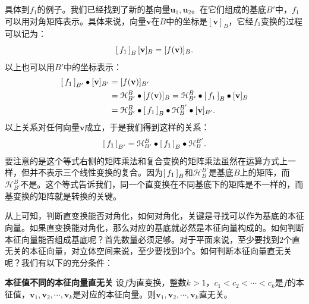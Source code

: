 \documentclass[12pt,UTF8,fontset=none]{ctexbook}
\begin{document}
具体到$f_1$的例子。我们已经找到了新的基向量$\mathbf{u}_1,\mathbf{u}_2$。在它们组成的基底$B'$中，$f_1$可以用对角矩阵表示。具体来说，向量$\mathbf{v}$在$B$中的坐标是$[\mathbf{v}]_B$，它经$f_1$变换的过程可以记为：
$$ 
\bmat{f_1}[B] [\mathbf{v}]_B = [f(\mathbf{v})]_B.
$$
以上也可以用$B'$中的坐标表示：
\begin{align*}
    \bmat{f_1}[B'] \bullet[\mathbf{v}]_{B'} &= [f(\mathbf{v})]_{B'} \\
    &= \mathcal{H}_{B'}^B\bullet [f(\mathbf{v})]_{B}  = \mathcal{H}_{B'}^B \bullet\bmat{f_1}[B] \bullet[\mathbf{v}]_B\\
    &= \mathcal{H}_{B'}^B \bullet \bmat{f_1}[B] \bullet\mathcal{H}_B^{B'}\bullet [\mathbf{v}]_{B'}.
\end{align*}
以上关系对任何向量$\mathbf{v}$成立，于是我们得到这样的关系：
$$
\bmat{f_1}[B'] = \mathcal{H}_{B'}^B\bullet\bmat{f_1}[B]\bullet\mathcal{H}_B^{B'}.
$$
要注意的是这个等式右侧的矩阵乘法和复合变换的矩阵乘法虽然在运算方式上一样，但并不表示三个线性变换的复合。因为$\bmat{f_1}[B]$和$\mathcal{H}_B^{B'}$是基底$B$上的矩阵，而$\mathcal{H}_{B'}^B$不是。这个等式告诉我们，同一个直变换在不同基底下的矩阵是不一样的，而基变换的矩阵就是转换的关键。

从上可知，判断直变换能否对角化，如何对角化，关键是寻找可以作为基底的本征向量。如果直变换能对角化，那么对应的基底就必然是本征向量构成的。如何判断本征向量能否组成基底呢？首先数量必须足够。对于平面来说，至少要找到$2$个直无关的本征向量，对立体空间来说，至少要找到$3$个。如何判断本征向量直无关呢？我们有以下的充分条件：
\begin{tm}{\textbf{本征值不同的本征向量直无关}}
    设$f$为直变换，整数$k>1$，$c_1<c_2<\cdots<c_k$是$f$的本征值，$\mathbf{v}_1,\mathbf{v}_2,\cdots,\mathbf{v}_k$是对应的本征向量。则$\mathbf{v}_1,\mathbf{v}_2,\cdots,\mathbf{v}_k$直无关。
\end{tm}
\end{document}
